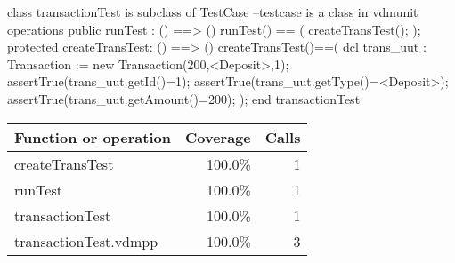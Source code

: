 \documentclass[a4paper]{article}
\begin{document}
\title{}
\author{}
\begin{vdm_al}

class transactionTest is subclass of TestCase --testcase is a class in vdmunit
operations
    public runTest : () ==> ()
    runTest() == (
        createTransTest();
    );
    protected createTransTest: () ==> ()
    createTransTest()==(
        dcl trans_uut : Transaction := new Transaction(200,<Deposit>,1);
        assertTrue(trans_uut.getId()=1);
        assertTrue(trans_uut.getType()=<Deposit>);
        assertTrue(trans_uut.getAmount()=200);
    );
end transactionTest
\end{vdm_al}
\bigskip
\begin{longtable}{|l|r|r|}
\hline
Function or operation & Coverage & Calls \\
\hline
\hline
createTransTest & 100.0\% & 1 \\
\hline
runTest & 100.0\% & 1 \\
\hline
transactionTest & 100.0\% & 1 \\
\hline
\hline
transactionTest.vdmpp & 100.0\% & 3 \\
\hline
\end{longtable}
\end{document}
